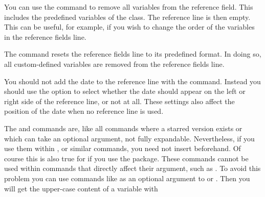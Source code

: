 You can use the  command to remove all variables from
the reference field. This includes the predefined variables of the class. The
reference line is then empty. This can be useful, for example, if you wish to
change the order of the variables in the reference fields line.

The  command resets the reference fields line to its
predefined format. In doing so, all custom-defined variables are removed from
the reference fields line.

You should not add the date to the reference line with
the  command. Instead you should use the
%
%
%
%
 option to select whether the date
should appear on the left or right side of the reference line, or not at all.
These settings also affect the position of the date when no reference line is
used.%
%
\EndIndexGroup


\begin{Declaration}
\end{Declaration}
The  and 
commands are, like all commands where a starred version exists or which can
take an optional argument, not fully expandable. Nevertheless, if you use them
within ,
 or similar commands, you
need not insert  beforehand. Of course
this is also true for
 if you use the
\hyperref[cha:scrlayer-scrpage]{}%
 package. These commands
cannot be used within commands that directly affect their argument, such as
%
. To avoid this problem you can use commands like
 as an optional argument to  or
. Then you will get the upper-case content of a variable
with
\begin{lstcode}[escapeinside=`']
\end{lstcode}
%
\EndIndexGroup


